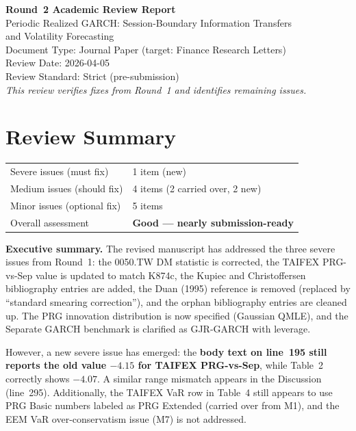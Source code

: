 \documentclass[12pt,a4paper]{article}
\begin{document}
\begin{center}
{\Large\bfseries Round~2 Academic Review Report}\\[0.5em]
{\large Periodic Realized GARCH: Session-Boundary Information Transfers\\
and Volatility Forecasting}\\[0.5em]
{\normalsize Document Type: Journal Paper (target: Finance Research Letters)}\\
{\normalsize Review Date: 2026-04-05}\\
{\normalsize Review Standard: Strict (pre-submission)}\\[0.3em]
{\normalsize\emph{This review verifies fixes from Round~1 and identifies remaining issues.}}
\end{center}

\bigskip

\section*{Review Summary}

\begin{tabular}{ll}
\textcolor{errorred}{Severe issues (must fix)} & 1 item (new) \\
\textcolor{warncolor}{Medium issues (should fix)} & 4 items (2 carried over, 2 new) \\
Minor issues (optional fix) & 5 items \\
Overall assessment & \textbf{Good --- nearly submission-ready} \\
\end{tabular}

\medskip
\noindent
\textbf{Executive summary.}
The revised manuscript has addressed the three severe issues from Round~1: the 0050.TW DM statistic is corrected, the TAIFEX PRG-vs-Sep value is updated to match K874c, the Kupiec and Christoffersen bibliography entries are added, the Duan (1995) reference is removed (replaced by ``standard smearing correction''), and the orphan bibliography entries are cleaned up. The PRG innovation distribution is now specified (Gaussian QMLE), and the Separate GARCH benchmark is clarified as GJR-GARCH with leverage.

However, a new severe issue has emerged: the \textbf{body text on line~195 still reports the old value $-4.15$ for TAIFEX PRG-vs-Sep}, while Table~2 correctly shows $-4.07$. A similar range mismatch appears in the Discussion (line~295). Additionally, the TAIFEX VaR row in Table~4 still appears to use PRG Basic numbers labeled as PRG Extended (carried over from M1), and the EEM VaR over-conservatism issue (M7) is not addressed.
\end{document}
